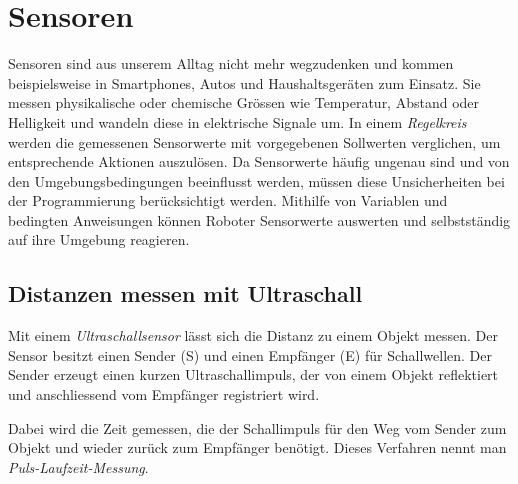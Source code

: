 \section{Sensoren}

Sensoren sind aus unserem Alltag nicht mehr wegzudenken und kommen
beispielsweise in Smartphones, Autos und Haushaltsgeräten zum Einsatz.
Sie messen physikalische oder chemische Grössen wie Temperatur,
Abstand oder Helligkeit und wandeln diese in elektrische Signale um.
In einem \emph{Regelkreis} werden die gemessenen Sensorwerte mit
vorgegebenen Sollwerten verglichen, um entsprechende Aktionen auszulösen.
Da Sensorwerte häufig ungenau sind und von den Umgebungsbedingungen
beeinflusst werden, müssen diese Unsicherheiten bei der Programmierung
berücksichtigt werden.
Mithilfe von Variablen und bedingten Anweisungen können Roboter
Sensorwerte auswerten und selbstständig auf ihre Umgebung reagieren.


\subsection*{Distanzen messen mit Ultraschall}

Mit einem \emph{Ultraschallsensor} lässt sich die Distanz zu einem
Objekt messen. Der Sensor besitzt einen Sender (S) und einen
Empfänger (E) für Schallwellen. Der Sender erzeugt einen kurzen
Ultraschallimpuls, der von einem Objekt reflektiert und anschliessend
vom Empfänger registriert wird.

Dabei wird die Zeit gemessen, die der Schallimpuls für den Weg
vom Sender zum Objekt und wieder zurück zum Empfänger benötigt.
Dieses Verfahren nennt man \emph{Puls-Laufzeit-Messung}.

